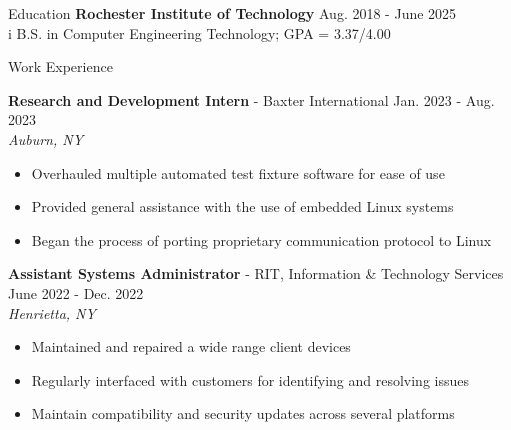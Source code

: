 \documentclass[UTF-8]{resume} \usepackage{multirow}
\begin{document}
\begin{rSection}{Education}
	{\bf Rochester Institute of Technology}  \hfill {Aug. 2018 - June 2025}\\i
	B.S. in Computer Engineering Technology; GPA = 3.37/4.00
\end{rSection}


\begin{rSection}{Work Experience}
	\vspace{-1.6em}
	\item \textbf{Research and Development Intern} {- Baxter International} \hfill {Jan. 2023 - Aug. 2023}\\
	\emph{Auburn, NY}
	\begin{itemize}
		\itemsep -6pt {}
		\item Overhauled multiple automated test fixture software for ease of use
		\item Provided general assistance with the use of embedded Linux systems
		\item Began the process of porting proprietary communication protocol to Linux
	\end{itemize}
	\item \textbf{Assistant Systems Administrator} {- RIT, Information \& Technology Services} \hfill {June 2022 - Dec. 2022}\\
	\emph{Henrietta, NY}
	\begin{itemize}
		\itemsep -6pt {}
		\item Maintained and repaired a wide range client devices
		\item Regularly interfaced with customers for identifying and resolving issues
		\item Maintain compatibility and security updates across several platforms
	\end{itemize}
\end{rSection}
\end{document}
